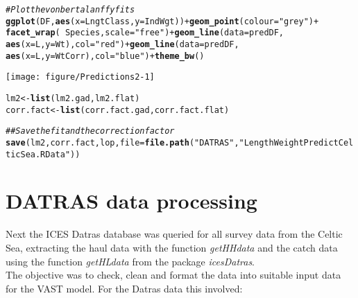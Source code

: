 \documentclass[12pt]{article}\usepackage[]{graphicx}\usepackage[]{color}
\makeatletter
\def\maxwidth{ %
  \ifdim\Gin@nat@width>\linewidth
    \linewidth
  \else
    \Gin@nat@width
  \fi
}
\newcommand{\hlstr}[1]{\textcolor[rgb]{0.192,0.494,0.8}{#1}}%
\newcommand{\hlcom}[1]{\textcolor[rgb]{0.678,0.584,0.686}{\textit{#1}}}%
\newcommand{\hlopt}[1]{\textcolor[rgb]{0,0,0}{#1}}%
\newcommand{\hlstd}[1]{\textcolor[rgb]{0.345,0.345,0.345}{#1}}%
\newcommand{\hlkwb}[1]{\textcolor[rgb]{0.69,0.353,0.396}{#1}}%
\newcommand{\hlkwc}[1]{\textcolor[rgb]{0.333,0.667,0.333}{#1}}%
\newcommand{\hlkwd}[1]{\textcolor[rgb]{0.737,0.353,0.396}{\textbf{#1}}}%
\newenvironment{kframe}{%
 \def\at@end@of@kframe{}%
 \ifinner\ifhmode%
  \def\at@end@of@kframe{\end{minipage}}%
  \begin{minipage}{\columnwidth}%
 \fi\fi%
 \def\FrameCommand##1{\hskip\@totalleftmargin \hskip-\fboxsep
 \colorbox{shadecolor}{##1}\hskip-\fboxsep
     \hskip-\linewidth \hskip-\@totalleftmargin \hskip\columnwidth}%
 \MakeFramed {\advance\hsize-\width
   \@totalleftmargin\z@ \linewidth\hsize
   \@setminipage}}%
 {\par\unskip\endMakeFramed%
 \at@end@of@kframe}
\newenvironment{knitrout}{}{} %
\makeatother
\begin{document}
\begin{knitrout}
\begin{kframe}
\begin{alltt}
\hlcom{# Plot the von bertalanffy fits}
\hlkwd{ggplot}\hlstd{(DF,} \hlkwd{aes}\hlstd{(}\hlkwc{x} \hlstd{= LngtClass,} \hlkwc{y} \hlstd{= IndWgt))} \hlopt{+} \hlkwd{geom_point}\hlstd{(}\hlkwc{colour} \hlstd{=} \hlstr{"grey"}\hlstd{)} \hlopt{+}
    \hlkwd{facet_wrap}\hlstd{(}\hlopt{~}\hlstd{Species,} \hlkwc{scale} \hlstd{=} \hlstr{"free"}\hlstd{)} \hlopt{+} \hlkwd{geom_line}\hlstd{(}\hlkwc{data} \hlstd{= predDF,}
    \hlkwd{aes}\hlstd{(}\hlkwc{x} \hlstd{= L,} \hlkwc{y} \hlstd{= Wt),} \hlkwc{col} \hlstd{=} \hlstr{"red"}\hlstd{)} \hlopt{+} \hlkwd{geom_line}\hlstd{(}\hlkwc{data} \hlstd{= predDF,}
    \hlkwd{aes}\hlstd{(}\hlkwc{x} \hlstd{= L,} \hlkwc{y} \hlstd{= WtCorr),} \hlkwc{col} \hlstd{=} \hlstr{"blue"}\hlstd{)} \hlopt{+} \hlkwd{theme_bw}\hlstd{()}
\end{alltt}
\end{kframe}
\texttt{[image: figure/Predictions2-1]} 
\begin{kframe}\begin{alltt}
\hlstd{lm2} \hlkwb{<-} \hlkwd{list}\hlstd{(lm2.gad, lm2.flat)}
\hlstd{corr.fact} \hlkwb{<-} \hlkwd{list}\hlstd{(corr.fact.gad, corr.fact.flat)}

\hlcom{## Save the fit and the correction factor}
\hlkwd{save}\hlstd{(lm2, corr.fact, lop,} \hlkwc{file} \hlstd{=} \hlkwd{file.path}\hlstd{(}\hlstr{"DATRAS"}\hlstd{,} \hlstr{"LengthWeightPredictCelticSea.RData"}\hlstd{))}
\end{alltt}
\end{kframe}
\end{knitrout}

\section{DATRAS data processing}

Next the ICES Datras database was queried for all survey data from the Celtic
Sea, extracting the haul data with the function \textit{getHHdata} and the
catch data using the function \textit{getHLdata} from the package
\textit{icesDatras}. \\

The objective was to check, clean and format the data into suitable input data
for the VAST model. For the Datras data this involved:
\end{document}
